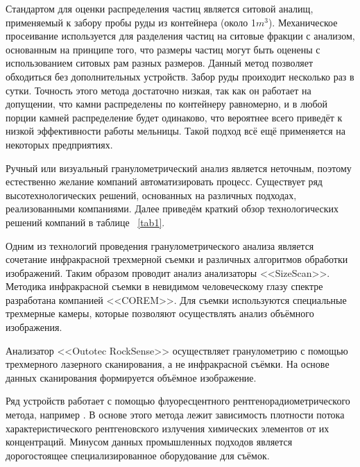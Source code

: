 \documentclass[specification,annotation,times]{itmo-student-thesis}
\begin{document}
 Стандартом для оценки распределения частиц является ситовой аналищ,  применяемый к забору пробы руды из контейнера (около 1$m^3$). Механическое просеивание используется для разделения частиц на ситовые фракции с анализом, основанным на принципе того, что размеры частиц могут быть оценены с использованием ситовых рам разных размеров.  Данный метод позволяет обходиться без дополнительных устройств. Забор руды проиходит несколько раз в сутки. Точность этого метода достаточно низкая, так как он работает на допущении, что камни распределены по контейнеру равномерно, и в любой порции камней распределение будет одинаково, что вероятнее всего приведёт к низкой эффективности работы мельницы. Такой подход всё ещё применяется на некоторых предприятиях. 
 
Ручный или визуальный гранулометрический анализ является неточным, поэтому естественно желание компаний автоматизировать процесс. Существует ряд высотехнологических решений, основанных на различных подходах, реализованными компаниями. Далее приведём краткий обзор технологических решений компаний в таблице ~\ref{tab1}.
 
 Одним из технологий проведения гранулометрического анализа является  сочетание инфракрасной трехмерной съемки и различных алгоритмов обработки изображений. Таким образом проводит анализ анализаторы <<SizeScan>>.  Методика инфракрасной съемки в невидимом человеческому глазу спектре разработана компанией <<COREM>>. Для съемки используются специальные  трехмерные камеры,  которые позволяют осуществлять анализ объёмного изображения. 
 
 Анализатор <<Outotec RockSense>> осуществляет гранулометрию с помощью трехмерного лазерного сканирования, а не инфракрасной съёмки. На основе данных сканирования формируется объёмное изображение.
 
Ряд устройств работает  с помощью флуоресцентного рентгенорадиометрического метода, например  .  В основе этого метода лежит зависимость плотности потока характеристического рентгеновского излучения химических элементов от их концентраций.
Минусом данных промышленных подходов является дорогостоящее специализированное оборудование для съёмок. 
\end{document}
